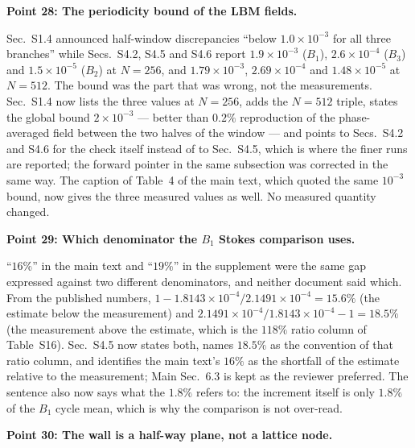 \documentclass[11pt,a4paper]{article}
\begin{document}
\vspace{1em}

\noindent\textbf{Point 28: The periodicity bound of the LBM fields.}

Sec.~S1.4 announced half-window discrepancies ``below $1.0\times10^{-3}$ for all three
branches'' while Secs.~S4.2, S4.5 and S4.6 report
$1.9\times10^{-3}$ ($B_1$), $2.6\times10^{-4}$ ($B_3$) and $1.5\times10^{-5}$ ($B_2$)
at $N=256$, and $1.79\times10^{-3}$, $2.69\times10^{-4}$ and $1.48\times10^{-5}$ at
$N=512$. The bound was the part that was wrong, not the measurements. Sec.~S1.4 now
lists the three values at $N=256$, adds the $N=512$ triple, states the global bound
$2\times10^{-3}$ --- better than $0.2\%$ reproduction of the phase-averaged field
between the two halves of the window --- and points to Secs.~S4.2 and S4.6 for the
check itself instead of to Sec.~S4.5, which is where the finer runs are reported; the
forward pointer in the same subsection was corrected in the same way. The caption of
Table~4 of the main text, which quoted the same $10^{-3}$ bound, now gives the three
measured values as well. No measured quantity changed.

\vspace{1em}

\noindent\textbf{Point 29: Which denominator the $B_1$ Stokes comparison uses.}

``$16\%$'' in the main text and ``$19\%$'' in the supplement were the same gap
expressed against two different denominators, and neither document said which. From
the published numbers, $1-1.8143\times10^{-4}/2.1491\times10^{-4}=15.6\%$ (the
estimate below the measurement) and
$2.1491\times10^{-4}/1.8143\times10^{-4}-1=18.5\%$ (the measurement above the
estimate, which is the $118\%$ ratio column of Table~S16). Sec.~S4.5 now states both,
names $18.5\%$ as the convention of that ratio column, and identifies the main text's
$16\%$ as the shortfall of the estimate relative to the measurement; Main Sec.~6.3 is
kept as the reviewer preferred. The sentence also now says what the $1.8\%$ refers to:
the increment itself is only $1.8\%$ of the $B_1$ cycle mean, which is why the
comparison is not over-read.

\vspace{1em}

\noindent\textbf{Point 30: The wall is a half-way plane, not a lattice node.}
\end{document}
